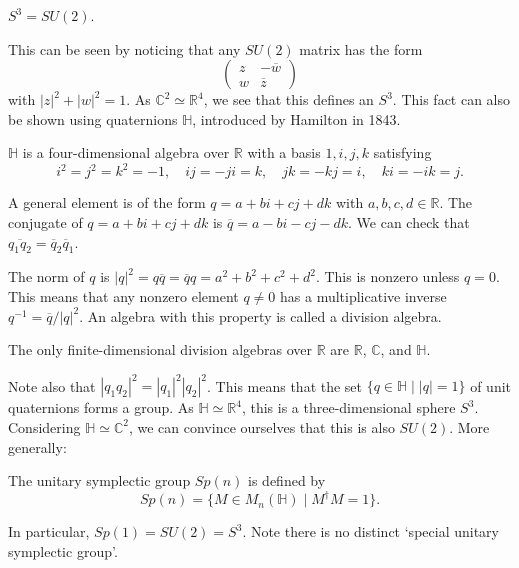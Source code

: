 \documentclass[12pt]{article}
\numberwithin{equation}{section}
\numberwithin{figure}{section}
\theoremstyle{remark}
\def\bC{\mathbb{C}}
\def\bH{\mathbb{H}}
\def\bR{\mathbb{R}}
\let\bar\overline
\begin{document}
\begin{proposition}
$S^3=SU(2)$.
\end{proposition}
This can be seen by noticing that any $SU(2)$ matrix has the form \begin{equation}
  \begin{pmatrix}
    z & -\overline w\\
    w & \overline z
  \end{pmatrix}
\end{equation} with $|z|^2+|w|^2=1$.
As $\bC^2\simeq \bR^4$, we see that this defines an $S^3$.
This fact can also be shown using quaternions $\bH$, 
introduced by Hamilton in 1843.
\begin{definition}
$\bH$ is a four-dimensional algebra over $\bR$ with a basis $1,i,j,k$ satisfying \begin{equation}
  i^2=j^2=k^2=-1, \quad
  ij=-ji=k, \quad
  jk=-kj=i, \quad
  ki=-ik=j.\label{eq:rel-of-H}
\end{equation}
\end{definition}

A general element is of the form $q=a+bi+cj+dk$ with $a,b,c,d\in \bR$.
The conjugate of $q=a+bi+cj+dk$ is $\bar q=a-bi-cj-dk$.
We can check that $\overline{q_1 q_2}=\bar q_2 \bar q_1$.

The norm of $q$ is $|q|^2=q\bar q=\bar q q=a^2+b^2+c^2+d^2$.
This is nonzero unless $q=0$.
This means that any nonzero element $q\neq 0$ has a multiplicative inverse $q^{-1}=\bar q/|q|^2$.
An algebra with this property is called a division algebra.
\begin{fact}
  The only finite-dimensional division algebras over $\bR$ are $\bR$, $\bC$, and $\bH$.
\end{fact}

Note also that $|q_1 q_2|^2=|q_1|^2 |q_2|^2$.
This means that the set $\{ q\in \bH \mid |q|=1 \}$ of unit quaternions forms a group.
As $\bH\simeq \bR^4$, this is a three-dimensional sphere $S^3$.
Considering $\bH\simeq \bC^2$, we can convince ourselves that this is also $SU(2)$.
More generally:
\begin{example}
  The unitary symplectic group $Sp(n)$ is defined by \begin{equation}
    Sp(n) = \{ M\in M_{n}(\bH) \mid M^\dagger M = 1 \}.
  \end{equation}
\end{example}
In particular, $Sp(1)=SU(2)=S^3$.
Note there is no distinct `special unitary symplectic group'.
\end{document}
